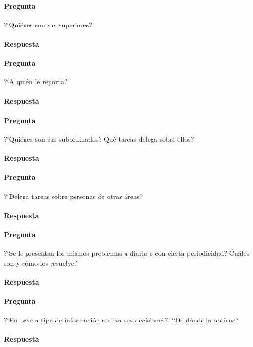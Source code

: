 \documentclass[12pt,a4paper,spanish]{article}
\begin{document}
	\paragraph{Pregunta}
	 ?`Qui\'enes son sus superiores? 
	\paragraph{Respuesta}

	\paragraph{Pregunta}
	 ?`A qui\'en le reporta?
	\paragraph{Respuesta}

	\paragraph{Pregunta}
	 ?`Qui\'enes son sus subordinados? \'Qu\'e tareas delega sobre ellos?
	\paragraph{Respuesta}

	\paragraph{Pregunta}
	 ?`Delega tareas sobre personas de otras \'areas?
	\paragraph{Respuesta}

	\paragraph{Pregunta}
	 ?`Se le presentan los mismos problemas a diario o con cierta periodicidad? \'Cu\'ales son y c\'omo los resuelve?
	\paragraph{Respuesta}

	\paragraph{Pregunta}
	 ?`En base a tipo de informaci\'on realiza sus decisiones?  ?`De d\'onde la obtiene?
	\paragraph{Respuesta}
\end{document}
